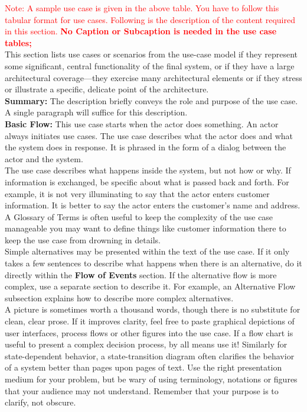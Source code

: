 \documentclass{FastFyp}
\begin{document}
\textcolor{red}{Note: A sample use case is given in the above table. You have to follow this tabular format for use cases. Following is the description of the content required in this section. \textbf{No Caption or Subcaption is needed in the use case tables;} }\\
This section lists use cases or scenarios from the use-case model if they represent some significant, central functionality of the final system, or if they have a large architectural coverage—they exercise many architectural elements or if they stress or illustrate a specific, delicate point of the architecture.\\
\textbf{Summary:} The description briefly conveys the role and purpose of the use case. A single paragraph will suffice for this description.\\
\textbf{Basic Flow:} This use case starts when the actor does something. An actor always initiates use cases. The use case describes what the actor does and what the system does in response. It is phrased in the form of a dialog between the actor and the system.\\
The use case describes what happens inside the system, but not how or why. If information is exchanged, be specific about what is passed back and forth. For example, it is not very illuminating to say that the actor enters customer information. It is better to say the actor enters the customer’s name and address. A Glossary of Terms is often useful to keep the complexity of the use case manageable you may want to define things like customer information there to keep the use case from drowning in details.\\
Simple alternatives may be presented within the text of the use case. If it only takes a few sentences to describe what happens when there is an alternative, do it directly within the \textbf{Flow of Events} section. If the alternative flow is more complex, use a separate section to describe it. For example, an Alternative Flow subsection explains how to describe more complex alternatives.\\
A picture is sometimes worth a thousand words, though there is no substitute for clean, clear prose. If it improves clarity, feel free to paste graphical depictions of user interfaces, process flows or other figures into the use case. If a flow chart is useful to present a complex decision process, by all means use it!  Similarly for state-dependent behavior, a state-transition diagram often clarifies the behavior of a system better than pages upon pages of text. Use the right presentation medium for your problem, but be wary of using terminology, notations or figures that your audience may not understand. Remember that your purpose is to clarify, not obscure.\\
\end{document}
